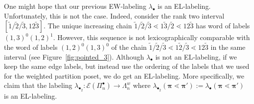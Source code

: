 \documentclass[11pt]{article}
\theoremstyle{definition}
\numberwithin{equation}{section}
\newcommand{\cover}{\lessdot}
\newcommand{\bpi}{\pmb{\pi}}
\begin{document}
One might hope that our previous EW-labeling $\lambda_\bullet$ is an EL-labeling. Unfortunately, this is not the case. Indeed,  consider the rank two interval $[ \tilde{1}/\tilde{2}/\tilde{3},12\tilde{3}]$.  The unique increasing chain $\tilde{1}/\tilde{2}/\tilde{3}\cover 1\tilde{3}/\tilde{2}\cover 12\tilde{3}$ has word of labels $(1,3)^0(1,2)^1$.  However, this sequence is not lexicographically comparable with the word of labels $(1,2)^0(1,3)^0$ of the chain $\tilde{1}/\tilde{2}/\tilde{3}\cover 1\tilde{2}/\tilde{3}\cover 12\tilde{3}$ in the same interval (see Figure~\ref{fig:pointed_3}).  Although $\lambda_\bullet$  is not an EL-labeling, if we keep the same edge labels, but instead use the ordering of the labels that we used for the weighted partition poset, we do get an EL-labeling.  More specifically, we claim that the labeling  $\lambda_{\bullet_2}: \mathcal{E}(\Pi_n^\bullet) \rightarrow \Lambda_n^w$  where $\lambda_{\bullet_2}(\bpi \cover \bpi') := \lambda_{\bullet}(\bpi \cover \bpi')$ is an EL-labeling.
\end{document}
